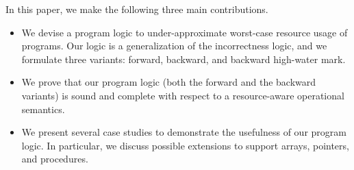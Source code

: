 %
In this paper, we make the following three main contributions.
%
\begin{itemize}
  \item We devise a program logic to under-approximate worst-case resource usage of programs. Our logic is a generalization of the incorrectness logic, and we formulate three variants: forward, backward, and backward high-water mark.
  \item We prove that our program logic (both the forward and the backward variants) is sound and complete with respect to a resource-aware operational semantics.
  \item We present several case studies to demonstrate the usefulness of our program logic. In particular, we discuss possible extensions to support arrays, pointers, and procedures.
\end{itemize}
